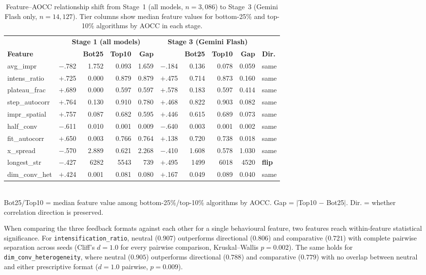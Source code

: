 \begin{table}[!t]
\centering
\caption{Feature--AOCC relationship shift from Stage~1 (all models, $n{=}3{,}086$) to Stage~3 (Gemini Flash only, $n{=}14{,}127$). Tier columns show median feature values for bottom-25\% and top-10\% algorithms by AOCC in each stage.}
\label{tab:correlation-shift}
\footnotesize
\begin{tabular}{@{}l|rrrr|rrrr|l@{}}
\toprule
& \multicolumn{4}{c|}{\textbf{Stage 1 (all models)}} & \multicolumn{4}{c|}{\textbf{Stage 3 (Gemini Flash)}} & \\
\textbf{Feature} & \boldmath{$\rho$} & \textbf{Bot25} & \textbf{Top10} & \textbf{Gap} & \boldmath{$\rho$} & \textbf{Bot25} & \textbf{Top10} & \textbf{Gap} & \textbf{Dir.} \\
\midrule
avg\_impr       & $-$.782 & 1.752 & 0.093 & 1.659 & $-$.184 & 0.136 & 0.078 & 0.059 & same \\
intens\_ratio   & $+$.725 & 0.000 & 0.879 & 0.879 & $+$.475 & 0.714 & 0.873 & 0.160 & same \\
plateau\_frac   & $+$.689 & 0.000 & 0.597 & 0.597 & $+$.578 & 0.183 & 0.597 & 0.414 & same \\
step\_autocorr  & $+$.764 & 0.130 & 0.910 & 0.780 & $+$.468 & 0.822 & 0.903 & 0.082 & same \\
impr\_spatial   & $+$.757 & 0.087 & 0.682 & 0.595 & $+$.446 & 0.615 & 0.689 & 0.073 & same \\
half\_conv      & $-$.611 & 0.010 & 0.001 & 0.009 & $-$.640 & 0.003 & 0.001 & 0.002 & same \\
fit\_autocorr   & $+$.650 & 0.003 & 0.766 & 0.764 & $+$.138 & 0.720 & 0.738 & 0.018 & same \\
x\_spread       & $-$.570 & 2.889 & 0.621 & 2.268 & $-$.410 & 1.608 & 0.578 & 1.030 & same \\
longest\_str    & $-$.427 & 6282  & 5543  & 739   & $+$.495 & 1499  & 6018  & 4520  & \textbf{flip} \\
dim\_conv\_het  & $+$.424 & 0.001 & 0.081 & 0.080 & $+$.167 & 0.049 & 0.089 & 0.040 & same \\
\bottomrule
\end{tabular}
\\[0.3em]
{\scriptsize Bot25/Top10 = median feature value among bottom-25\%/top-10\% algorithms by AOCC. Gap = $|$Top10 $-$ Bot25$|$. Dir. = whether correlation direction is preserved.}
\end{table}

When comparing the three feedback formats against each other for a single behavioural feature, two features reach within-feature statistical significance. For \texttt{intensification\_ratio}, neutral ($0.907$) outperforms directional ($0.806$) and comparative ($0.721$) with complete pairwise separation across seeds (Cliff's $d = 1.0$ for every pairwise comparison, Kruskal--Wallis $p = 0.002$). The same holds for \texttt{dim\_conv\_heterogeneity}, where neutral ($0.905$) outperforms directional ($0.788$) and comparative ($0.779$) with no overlap between neutral and either prescriptive format ($d = 1.0$ pairwise, $p = 0.009$).

